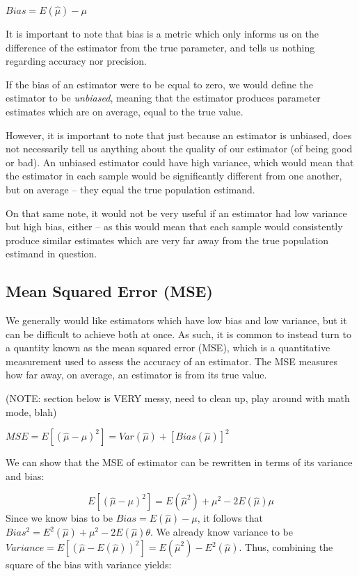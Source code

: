 \documentclass[12pt, twoside]{amherstthesis}
\begin{document}
\(Bias = E(\hat{\mu}) - \mu\)

It is important to note that bias is a metric which only informs us on the difference of the estimator from the true parameter, and tells us nothing regarding accuracy nor precision.

If the bias of an estimator were to be equal to zero, we would define the estimator to be \emph{unbiased}, meaning that the estimator produces parameter estimates which are on average, equal to the true value.

However, it is important to note that just because an estimator is unbiased, does not necessarily tell us anything about the quality of our estimator (of being good or bad). An unbiased estimator could have high variance, which would mean that the estimator in each sample would be significantly different from one another, but on average -- they equal the true population estimand.

On that same note, it would not be very useful if an estimator had low variance but high bias, either -- as this would mean that each sample would consistently produce similar estimates which are very far away from the true population estimand in question.

\hypertarget{mean-squared-error-mse}{%
\subsection{Mean Squared Error (MSE)}\label{mean-squared-error-mse}}

We generally would like estimators which have low bias and low variance, but it can be difficult to achieve both at once. As such, it is common to instead turn to a quantity known as the mean squared error (MSE), which is a quantitative measurement used to assess the accuracy of an estimator. The MSE measures how far away, on average, an estimator is from its true value.

(NOTE: section below is VERY messy, need to clean up, play around with math mode, blah)

\(MSE = E[(\hat{\mu} -\mu)^2] = Var(\hat{\mu})+[Bias(\hat{\mu})]^2\)

We can show that the MSE of estimator can be rewritten in terms of its variance and bias:

\[E[(\hat{\mu} -\mu)^2] = E(\hat{\mu}^2) + \mu^2 - 2E(\hat{\mu})\mu\]
Since we know bias to be \(Bias = E(\hat{\mu}) - \mu\), it follows that \(Bias^2 = E^2(\hat{\mu}) +\mu^2 -2E(\hat{\mu})\theta\). We already know variance to be \(Variance = E[(\hat{\mu}-E(\hat{\mu}))^2] = E(\hat{\mu}^2) - E^2(\hat{\mu})\). Thus, combining the square of the bias with variance yields:
\end{document}
